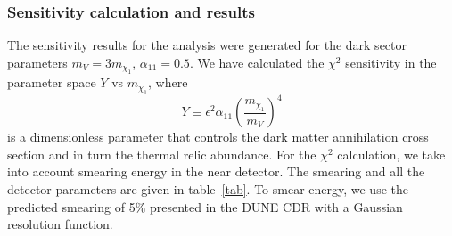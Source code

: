 \subsubsection{Sensitivity calculation and results}
The sensitivity results for the analysis were generated for the dark sector parameters  $m_{V}=3m_{\chi_1}$, $\alpha_{11}=0.5$. 
We have calculated the $\chi^{2}$ sensitivity in the parameter space $Y$ vs $m_{\chi_1}$, where 
\begin{equation}
Y\equiv\epsilon^{2}\alpha_{11} (\frac{m_{\chi_1}}{m_{V}})^{4}
\end{equation}
is a dimensionless parameter that controls the dark matter annihilation cross section and in turn the thermal relic abundance. 
For the $\chi^{2}$ calculation, we take into account smearing energy in the  near detector.
The smearing and all the detector parameters are given in table~\ref{tab}. 
To smear energy, we use the predicted smearing of 5$\%$ presented in the DUNE CDR \cite{Acciarri:2015uup} with a Gaussian resolution function.
